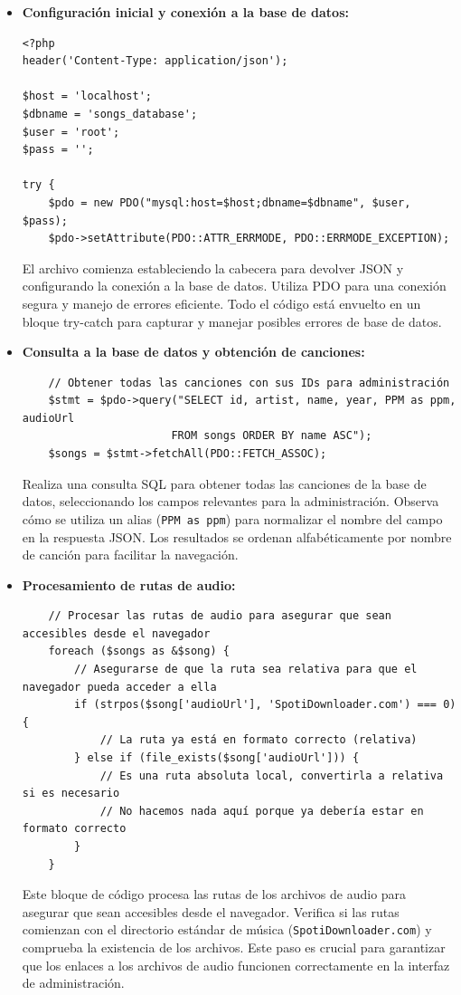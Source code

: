 \documentclass[a4paper,12pt]{article}
\begin{document}
\begin{itemize}
    \item \textbf{Configuración inicial y conexión a la base de datos:}
    \begin{verbatim}
<?php
header('Content-Type: application/json');

$host = 'localhost';
$dbname = 'songs_database';
$user = 'root';
$pass = '';

try {
    $pdo = new PDO("mysql:host=$host;dbname=$dbname", $user, $pass);
    $pdo->setAttribute(PDO::ATTR_ERRMODE, PDO::ERRMODE_EXCEPTION);
    \end{verbatim}
    El archivo comienza estableciendo la cabecera para devolver JSON y configurando la conexión a la base de datos. Utiliza PDO para una conexión segura y manejo de errores eficiente. Todo el código está envuelto en un bloque try-catch para capturar y manejar posibles errores de base de datos.
    
    \item \textbf{Consulta a la base de datos y obtención de canciones:}
    \begin{verbatim}
    // Obtener todas las canciones con sus IDs para administración
    $stmt = $pdo->query("SELECT id, artist, name, year, PPM as ppm, audioUrl 
                       FROM songs ORDER BY name ASC");
    $songs = $stmt->fetchAll(PDO::FETCH_ASSOC);
    \end{verbatim}
    Realiza una consulta SQL para obtener todas las canciones de la base de datos, seleccionando los campos relevantes para la administración. Observa cómo se utiliza un alias (\texttt{PPM as ppm}) para normalizar el nombre del campo en la respuesta JSON. Los resultados se ordenan alfabéticamente por nombre de canción para facilitar la navegación.
    
    \item \textbf{Procesamiento de rutas de audio:}
    \begin{verbatim}
    // Procesar las rutas de audio para asegurar que sean accesibles desde el navegador
    foreach ($songs as &$song) {
        // Asegurarse de que la ruta sea relativa para que el navegador pueda acceder a ella
        if (strpos($song['audioUrl'], 'SpotiDownloader.com') === 0) {
            // La ruta ya está en formato correcto (relativa)
        } else if (file_exists($song['audioUrl'])) {
            // Es una ruta absoluta local, convertirla a relativa si es necesario
            // No hacemos nada aquí porque ya debería estar en formato correcto
        }
    }
    \end{verbatim}
    Este bloque de código procesa las rutas de los archivos de audio para asegurar que sean accesibles desde el navegador. Verifica si las rutas comienzan con el directorio estándar de música (\texttt{SpotiDownloader.com}) y comprueba la existencia de los archivos. Este paso es crucial para garantizar que los enlaces a los archivos de audio funcionen correctamente en la interfaz de administración.
    

\end{itemize}
\end{document}
